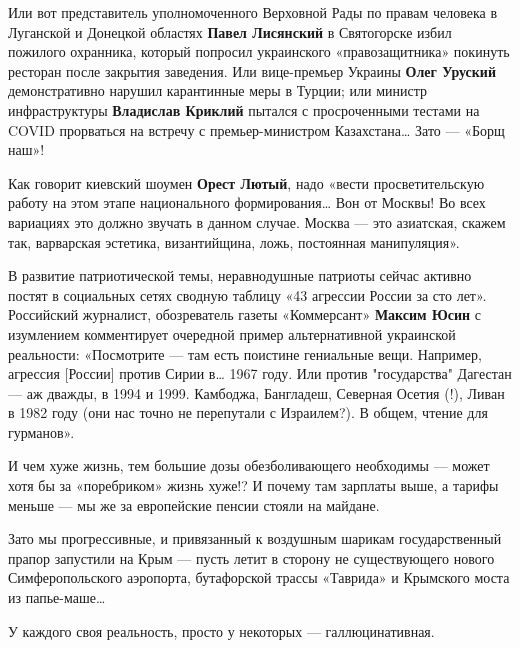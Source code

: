Или вот представитель уполномоченного Верховной Рады по правам человека в
Луганской и Донецкой областях \textbf{Павел Лисянский} в Святогорске избил пожилого
охранника, который попросил украинского «правозащитника» покинуть ресторан
после закрытия заведения. Или вице-премьер Украины \textbf{Олег Уруский} демонстративно
нарушил карантинные меры в Турции; или министр инфраструктуры \textbf{Владислав Криклий}
пытался с просроченными тестами на COVID прорваться на встречу с
премьер-министром Казахстана… Зато — «Борщ наш»!

Как говорит киевский шоумен \textbf{Орест Лютый}, надо «вести просветительскую работу на
этом этапе национального формирования… Вон от Москвы! Во всех вариациях это
должно звучать в данном случае. Москва — это азиатская, скажем так, варварская
эстетика, византийщина, ложь, постоянная манипуляция».

В развитие патриотической темы, неравнодушные патриоты сейчас активно постят в
социальных сетях сводную таблицу «43 агрессии России за сто лет». Российский
журналист, обозреватель газеты «Коммерсант» \textbf{Максим Юсин} с изумлением
комментирует очередной пример альтернативной украинской реальности: «Посмотрите
— там есть поистине гениальные вещи. Например, агрессия [России] против Сирии
в… 1967 году. Или против "государства" Дагестан — аж дважды, в 1994 и 1999.
Камбоджа, Бангладеш, Северная Осетия (!), Ливан в 1982 году (они нас точно не
перепутали с Израилем?). В общем, чтение для гурманов».

И чем хуже жизнь, тем большие дозы обезболивающего необходимы — может хотя бы
за «поребриком» жизнь хуже!? И почему там зарплаты выше, а тарифы меньше — мы
же за европейские пенсии стояли на майдане.

Зато мы прогрессивные, и привязанный к воздушным шарикам государственный прапор
запустили на Крым — пусть летит в сторону не существующего нового
Симферопольского аэропорта, бутафорской трассы «Таврида» и Крымского моста из
папье-маше…

У каждого своя реальность, просто у некоторых — галлюцинативная.

